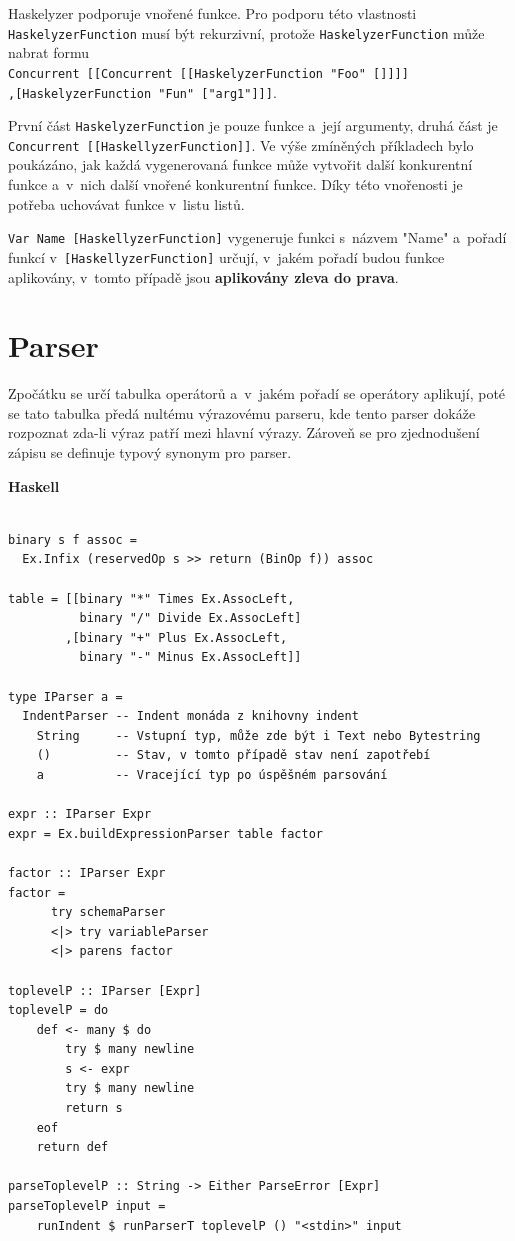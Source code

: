 \documentclass[male, czech]{kithesis}
\newcommand{\haskellInline}[1]{\colorbox{gray!10}{\texttt{#1}}}
\begin{document}
Haskelyzer podporuje vnořené funkce. 
Pro podporu této vlastnosti \haskellInline{HaskelyzerFunction} musí být rekurzivní, 
protože \haskellInline{HaskelyzerFunction} může nabrat formu 
\\
\haskellInline{Concurrent [[Concurrent [[HaskelyzerFunction "Foo" []]]]}
\\
\haskellInline{,[HaskelyzerFunction "Fun" ["arg1"]]]}.

První část \haskellInline{HaskelyzerFunction} je pouze funkce
a~její argumenty, 
druhá část je \\
\haskellInline{Concurrent [[HaskellyzerFunction]]}.
Ve výše zmíněných příkladech bylo poukázáno, 
jak každá vygenerovaná funkce může vytvořit 
další konkurentní funkce a~v~nich další vnořené konkurentní funkce. 
Díky této vnořenosti 
je potřeba uchovávat funkce v~listu listů.

\haskellInline{Var Name [HaskellyzerFunction]} vygeneruje funkci s~názvem "Name"
a~pořadí funkcí v~\haskellInline{[HaskellyzerFunction]} určují, 
v~jakém pořadí budou funkce aplikovány,
v~tomto případě jsou \textbf{aplikovány zleva do prava}.

\section{Parser}

Zpočátku se určí tabulka operátorů
a~v~jakém pořadí se operátory aplikují, 
poté se tato tabulka předá nultému výrazovému parseru, 
kde tento parser dokáže rozpoznat zda-li výraz patří mezi
hlavní výrazy. 
Zároveň se pro zjednodušení zápisu se definuje typový 
synonym pro parser.

\textbf{Haskell}
\begin{verbatim}

binary s f assoc = 
  Ex.Infix (reservedOp s >> return (BinOp f)) assoc

table = [[binary "*" Times Ex.AssocLeft,
          binary "/" Divide Ex.AssocLeft]
        ,[binary "+" Plus Ex.AssocLeft,
          binary "-" Minus Ex.AssocLeft]]

type IParser a = 
  IndentParser -- Indent monáda z knihovny indent
    String     -- Vstupní typ, může zde být i Text nebo Bytestring
    ()         -- Stav, v tomto případě stav není zapotřebí
    a          -- Vracející typ po úspěšném parsování

expr :: IParser Expr
expr = Ex.buildExpressionParser table factor

factor :: IParser Expr
factor = 
      try schemaParser 
      <|> try variableParser
      <|> parens factor 

toplevelP :: IParser [Expr]
toplevelP = do 
    def <- many $ do 
        try $ many newline
        s <- expr 
        try $ many newline
        return s
    eof
    return def

parseToplevelP :: String -> Either ParseError [Expr]
parseToplevelP input = 
    runIndent $ runParserT toplevelP () "<stdin>" input

\end{verbatim}
\end{document}
